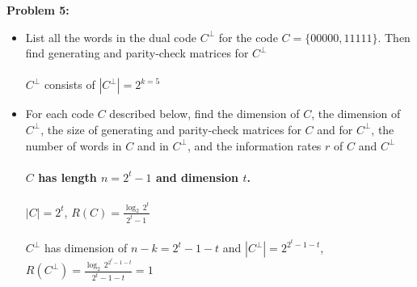 \documentclass[11pt]{article}
\newenvironment{problem}[1]{\textbf{Problem #1: }}{\newpage}
\begin{document}
\begin{problem}{5}
\begin{itemize}
\[\begin{array}{cccccc}
				\noalign{\medskip} 0&1&0&0&0&1 \\
				\noalign{\medskip} 0&0&1&0&1&0 \\
			\end{array}\right], \qquad \sigma^{-1} = \left(\begin{array}{cccccc}
			1&2&3&4&5&6 \\
			\noalign{\medskip} 1&4&3&2&5&6
			\end{array}\right), \qquad G = \left[\begin{array}{cccccc}
			1&1&0&0&0&0 \\
			\noalign{\medskip} 0&0&0&1&0&1 \\
			\noalign{\medskip} 0&0&1&0&1&0 \\
			\end{array}\right]\]
			\newpage
			\item[2.7.10]
			List all the words in the dual code $C^\perp$ for the code $C = \{00000, 11111\}$. Then find generating and parity-check matrices for $C^\perp$
			\\ \\
			$C^\perp$ consists of $|C^{\perp}| = 2^{k = 5}$
			\item[2.7.11] For each code $C$ described below, find the dimension of $C$, the dimension of $C^{\perp}$, the size of generating and parity-check matrices for $C$ and for $C^{\perp}$, the number of words in $C$ and in $C^{\perp}$, and the information rates $r$ of $C$ and $C^{\perp}$
			\\ \\
			\textbf{\boldmath$C$ has length $n = 2^t -1$ and dimension $t$.}
			\\ \\
			$|C| = 2^t$, $R(C) = \frac{\log_2\,2^t}{2^t - 1}$
			\\ \\
			$C^\perp$ has dimension of $n - k = 2^t - 1 - t$ and $|C^\perp| = 2^{2^t - 1 - t}$, $R(C^\perp) = \frac{\log_2\,2^{2^t - 1 - t}}{2^t - 1 - t} = 1$
		\end{itemize}
	\end{problem}
\end{document}
